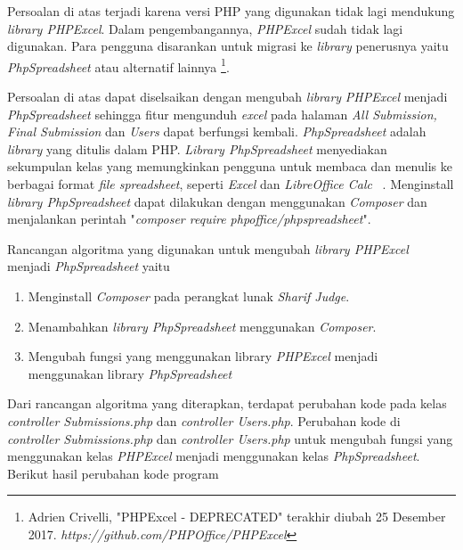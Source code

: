 	Persoalan di atas terjadi karena versi PHP yang digunakan tidak lagi mendukung \textit{library PHPExcel}. Dalam pengembangannya, \textit{PHPExcel} sudah tidak lagi digunakan. Para pengguna disarankan untuk migrasi ke \textit{library} penerusnya yaitu \textit{PhpSpreadsheet} atau alternatif lainnya \footnote{Adrien Crivelli, "PHPExcel - DEPRECATED" terakhir diubah 25 Desember 2017. \textit{https://github.com/PHPOffice/PHPExcel}}.
	
	Persoalan di atas dapat diselsaikan dengan mengubah \textit{library} \textit{PHPExcel} menjadi \textit{PhpSpreadsheet} sehingga fitur mengunduh \textit{excel} pada halaman \textit{All Submission, Final Submission} dan \textit{Users} dapat berfungsi kembali. \textit{PhpSpreadsheet} adalah \textit{library} yang ditulis dalam PHP. \textit{Library PhpSpreadsheet} menyediakan sekumpulan kelas yang memungkinkan pengguna untuk membaca dan menulis ke berbagai format \textit{file spreadsheet}, seperti \textit{Excel} dan \textit{LibreOffice Calc} ~\cite{phpoffice:10:phpspreadsheet}. Menginstall \textit{library PhpSpreadsheet} dapat dilakukan dengan menggunakan \textit{Composer} dan menjalankan perintah "\textit{composer require phpoffice/phpspreadsheet}".
	
	Rancangan algoritma yang digunakan untuk mengubah \textit{library PHPExcel} menjadi \textit{PhpSpreadsheet} yaitu
	\begin{enumerate}
		\item Menginstall \textit{Composer} pada perangkat lunak \textit{Sharif Judge}.
		\item Menambahkan \textit{library PhpSpreadsheet} menggunakan \textit{Composer}.
		\item Mengubah fungsi yang menggunakan library \textit{PHPExcel} menjadi menggunakan library \textit{PhpSpreadsheet}
	\end{enumerate}
	
	Dari rancangan algoritma yang diterapkan, terdapat perubahan kode pada kelas \textit{controller Submissions.php} dan \textit{controller Users.php}. Perubahan kode di \textit{controller Submissions.php} dan \textit{controller Users.php} untuk mengubah fungsi yang menggunakan kelas \textit{PHPExcel} menjadi menggunakan kelas \textit{PhpSpreadsheet}. Berikut hasil perubahan kode program
	
